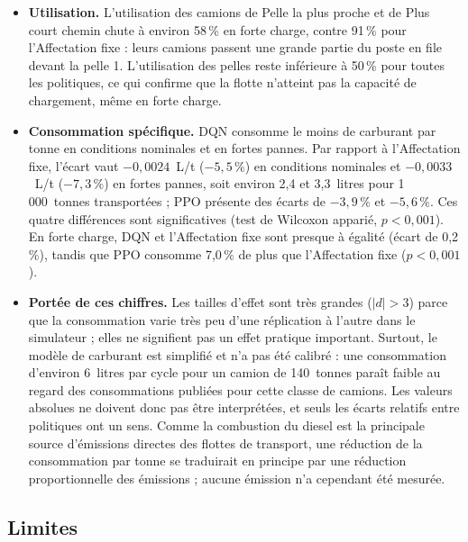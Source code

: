 \documentclass[11pt,a4paper]{article}
\newif\ifrevmarks
\newcommand{\revtag}[1]{\ifrevmarks\textsuperscript{\textcolor{red!70!black}{\scriptsize[#1]}}\fi}
\newenvironment{revbloc}[1]{\par\ifrevmarks\color{revcolor}\noindent\revtag{#1}\ \fi}{\par}
\newcommand{\aexp}[1]{\ifrevmarks\textcolor{orange!85!black}{\textbf{[EXPÉRIENCE À FAIRE : #1]}}\fi}
\begin{document}
\begin{revbloc}{M2, M18, M20, M22}
\begin{itemize}
  \item \textbf{Utilisation.} L'utilisation des camions de Pelle la plus proche et de Plus court chemin chute à environ 58\,\% en forte charge, contre 91\,\% pour l'Affectation fixe : leurs camions passent une grande partie du poste en file devant la pelle 1. L'utilisation des pelles reste inférieure à 50\,\% pour toutes les politiques, ce qui confirme que la flotte n'atteint pas la capacité de chargement, même en forte charge.
  \item \textbf{Consommation spécifique.} DQN consomme le moins de carburant par tonne en conditions nominales et en fortes pannes. Par rapport à l'Affectation fixe, l'écart vaut $-0{,}0024$~L/t ($-5{,}5\,\%$) en conditions nominales et $-0{,}0033$~L/t ($-7{,}3\,\%$) en fortes pannes, soit environ 2,4 et 3,3~litres pour 1\,000~tonnes transportées ; PPO présente des écarts de $-3{,}9\,\%$ et $-5{,}6\,\%$. Ces quatre différences sont significatives (test de Wilcoxon apparié, $p<0{,}001$). En forte charge, DQN et l'Affectation fixe sont presque à égalité (écart de 0,2\,\%), tandis que PPO consomme 7,0\,\% de plus que l'Affectation fixe ($p<0{,}001$).
  \item \textbf{Portée de ces chiffres.} Les tailles d'effet sont très grandes ($|d|>3$) parce que la consommation varie très peu d'une réplication à l'autre dans le simulateur ; elles ne signifient pas un effet pratique important. Surtout, le modèle de carburant est simplifié et n'a pas été calibré : une consommation d'environ 6~litres par cycle pour un camion de 140~tonnes paraît faible au regard des consommations publiées pour cette classe de camions. Les valeurs absolues ne doivent donc pas être interprétées, et seuls les écarts relatifs entre politiques ont un sens. Comme la combustion du diesel est la principale source d'émissions directes des flottes de transport, une réduction de la consommation par tonne se traduirait en principe par une réduction proportionnelle des émissions ; aucune émission n'a cependant été mesurée.
\end{itemize}
\end{revbloc}

\aexp{confronter le modèle de carburant à une donnée de constructeur ou de terrain (consommation horaire du camion de référence) avant toute interprétation en valeur absolue (M20).}

\subsection{Limites}
\label{sec:limitations}
\end{document}
